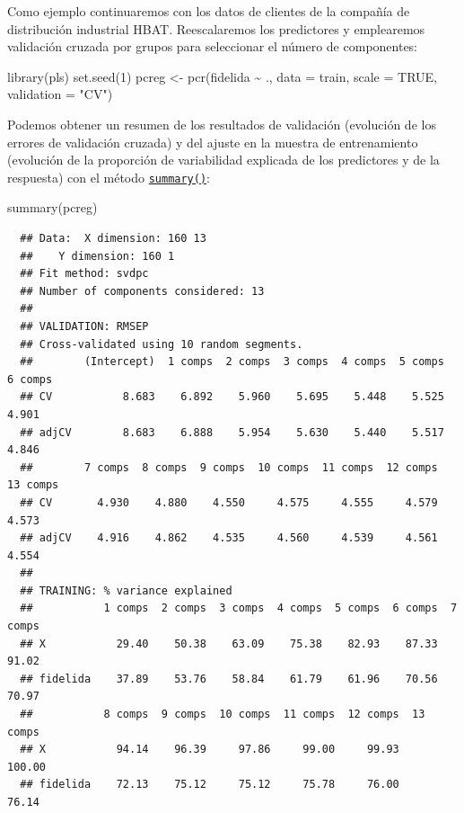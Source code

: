 \documentclass[
]{book}
\newenvironment{Shaded}{\begin{snugshade}}{\end{snugshade}}
\newcommand{\AttributeTok}[1]{\textcolor[rgb]{0.77,0.63,0.00}{#1}}
\newcommand{\ConstantTok}[1]{\textcolor[rgb]{0.00,0.00,0.00}{#1}}
\newcommand{\DecValTok}[1]{\textcolor[rgb]{0.00,0.00,0.81}{#1}}
\newcommand{\FunctionTok}[1]{\textcolor[rgb]{0.00,0.00,0.00}{#1}}
\newcommand{\NormalTok}[1]{#1}
\newcommand{\OtherTok}[1]{\textcolor[rgb]{0.56,0.35,0.01}{#1}}
\newcommand{\SpecialCharTok}[1]{\textcolor[rgb]{0.00,0.00,0.00}{#1}}
\newcommand{\StringTok}[1]{\textcolor[rgb]{0.31,0.60,0.02}{#1}}
\theoremstyle{break}
\theoremstyle{nonumberplain}
\begin{document}
Como ejemplo continuaremos con los datos de clientes de la compañía de distribución industrial HBAT.
Reescalaremos los predictores y emplearemos validación cruzada por grupos para seleccionar el número de componentes:

\begin{Shaded}
\begin{Highlighting}[]
\FunctionTok{library}\NormalTok{(pls)}
\FunctionTok{set.seed}\NormalTok{(}\DecValTok{1}\NormalTok{)}
\NormalTok{pcreg }\OtherTok{\textless{}{-}} \FunctionTok{pcr}\NormalTok{(fidelida }\SpecialCharTok{\textasciitilde{}}\NormalTok{ ., }\AttributeTok{data =}\NormalTok{ train, }\AttributeTok{scale =} \ConstantTok{TRUE}\NormalTok{, }\AttributeTok{validation =} \StringTok{"CV"}\NormalTok{)}
\end{Highlighting}
\end{Shaded}

Podemos obtener un resumen de los resultados de validación (evolución de los errores de validación cruzada) y del ajuste en la muestra de entrenamiento (evolución de la proporción de variabilidad explicada de los predictores y de la respuesta) con el método \href{https://rdrr.io/pkg/pls/man/summary.mvr.html}{\texttt{summary()}}:

\begin{Shaded}
\begin{Highlighting}[]
\FunctionTok{summary}\NormalTok{(pcreg)}
\end{Highlighting}
\end{Shaded}

\begin{verbatim}
  ## Data:  X dimension: 160 13 
  ##    Y dimension: 160 1
  ## Fit method: svdpc
  ## Number of components considered: 13
  ## 
  ## VALIDATION: RMSEP
  ## Cross-validated using 10 random segments.
  ##        (Intercept)  1 comps  2 comps  3 comps  4 comps  5 comps  6 comps
  ## CV           8.683    6.892    5.960    5.695    5.448    5.525    4.901
  ## adjCV        8.683    6.888    5.954    5.630    5.440    5.517    4.846
  ##        7 comps  8 comps  9 comps  10 comps  11 comps  12 comps  13 comps
  ## CV       4.930    4.880    4.550     4.575     4.555     4.579     4.573
  ## adjCV    4.916    4.862    4.535     4.560     4.539     4.561     4.554
  ## 
  ## TRAINING: % variance explained
  ##           1 comps  2 comps  3 comps  4 comps  5 comps  6 comps  7 comps
  ## X           29.40    50.38    63.09    75.38    82.93    87.33    91.02
  ## fidelida    37.89    53.76    58.84    61.79    61.96    70.56    70.97
  ##           8 comps  9 comps  10 comps  11 comps  12 comps  13 comps
  ## X           94.14    96.39     97.86     99.00     99.93    100.00
  ## fidelida    72.13    75.12     75.12     75.78     76.00     76.14
\end{verbatim}
\end{document}
